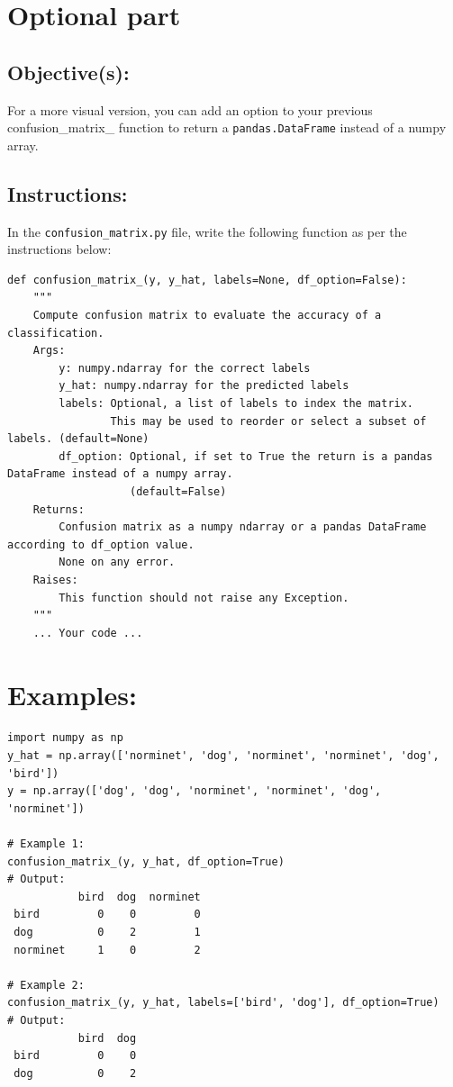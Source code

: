 \documentclass{42-en}
\begin{document}
\section{Optional part}

\subsection{Objective(s):}

For a more visual version, you can add an option to your previous confusion\_matrix\_ function to return a \texttt{pandas.DataFrame} instead of a numpy array.

\subsection{Instructions:}

In the \texttt{confusion\_matrix.py} file, write the following function as per the instructions below:

\begin{verbatim}
def confusion_matrix_(y, y_hat, labels=None, df_option=False):
    """
    Compute confusion matrix to evaluate the accuracy of a classification.
    Args:
        y: numpy.ndarray for the correct labels
        y_hat: numpy.ndarray for the predicted labels
        labels: Optional, a list of labels to index the matrix.
                This may be used to reorder or select a subset of labels. (default=None)
        df_option: Optional, if set to True the return is a pandas DataFrame instead of a numpy array.
                   (default=False)
    Returns: 
        Confusion matrix as a numpy ndarray or a pandas DataFrame according to df_option value.
        None on any error.
    Raises:
        This function should not raise any Exception.
    """
    ... Your code ...
\end{verbatim}

\section{Examples:}

\begin{verbatim}
import numpy as np
y_hat = np.array(['norminet', 'dog', 'norminet', 'norminet', 'dog', 'bird'])
y = np.array(['dog', 'dog', 'norminet', 'norminet', 'dog', 'norminet'])

# Example 1: 
confusion_matrix_(y, y_hat, df_option=True)
# Output:
           bird  dog  norminet
 bird         0    0         0
 dog          0    2         1
 norminet     1    0         2

# Example 2:
confusion_matrix_(y, y_hat, labels=['bird', 'dog'], df_option=True)
# Output:
           bird  dog
 bird         0    0
 dog          0    2
\end{verbatim}
\end{document}
